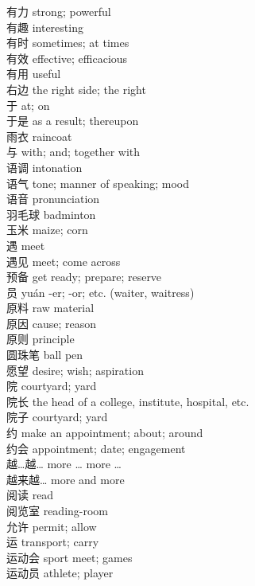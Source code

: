 有力 \quad strong; powerful\\
有趣 \quad interesting\\
有时 \quad sometimes; at times\\
有效 \quad effective; efficacious\\
有用 \quad useful\\
右边 \quad the right side; the right\\
于 \quad at; on\\
于是 \quad as a result; thereupon\\
雨衣 \quad raincoat\\
与 \quad with; and; together with\\
语调 \quad intonation\\
语气 \quad tone; manner of speaking; mood\\
语音 \quad pronunciation\\
羽毛球 \quad badminton\\
玉米 \quad maize; corn\\
遇 \quad meet\\
遇见 \quad meet; come across\\
预备 \quad get ready; prepare; reserve\\
员 \quad yuán \quad -er; -or; etc. (waiter, waitress)\\
原料 \quad raw material\\
原因 \quad cause; reason\\
原则 \quad principle\\
圆珠笔 \quad ball pen\\
愿望 \quad desire; wish; aspiration\\
院 \quad courtyard; yard\\
院长 \quad the head of a college, institute, hospital, etc.\\
院子 \quad courtyard; yard\\
约 \quad make an appointment; about; around\\
约会 \quad appointment; date; engagement\\
越…越… \quad more … more …\\
越来越… \quad more and more\\
阅读 \quad read\\
阅览室 \quad reading-room\\
允许 \quad permit; allow\\
运 \quad transport; carry\\
运动会 \quad sport meet; games\\
运动员 \quad athlete; player\\
